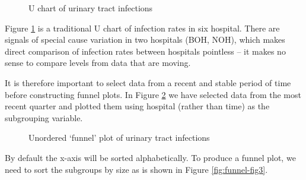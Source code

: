 \documentclass[
]{book}
\makeatletter
\newenvironment{Shaded}{\begin{snugshade}}{\end{snugshade}}
\newcommand{\AttributeTok}[1]{\textcolor[rgb]{0.13,0.29,0.53}{#1}}
\newcommand{\CommentTok}[1]{\textcolor[rgb]{0.56,0.35,0.01}{\textit{#1}}}
\newcommand{\DecValTok}[1]{\textcolor[rgb]{0.00,0.00,0.81}{#1}}
\newcommand{\FunctionTok}[1]{\textcolor[rgb]{0.13,0.29,0.53}{\textbf{#1}}}
\newcommand{\NormalTok}[1]{#1}
\newcommand{\OtherTok}[1]{\textcolor[rgb]{0.56,0.35,0.01}{#1}}
\newcommand{\SpecialCharTok}[1]{\textcolor[rgb]{0.81,0.36,0.00}{\textbf{#1}}}
\newcommand{\StringTok}[1]{\textcolor[rgb]{0.31,0.60,0.02}{#1}}
\newcommand*\pandocbounded[1]{%
  \sbox\pandoc@box{#1}%
  \Gscale@div\@tempa{\textheight}{\dimexpr\ht\pandoc@box+\dp\pandoc@box\relax}%
  \Gscale@div\@tempb{\linewidth}{\wd\pandoc@box}%
  \ifdim\@tempb\p@<\@tempa\p@\let\@tempa\@tempb\fi%
  \ifdim\@tempa\p@<\p@\scalebox{\@tempa}{\usebox\pandoc@box}%
  \else\usebox{\pandoc@box}%
  \fi%
}
\makeatother
\begin{document}
\begin{figure}
\centering
\pandocbounded{}
\caption{\label{fig:funnel-fig1}U chart of urinary tract infections}
\end{figure}

Figure \ref{fig:funnel-fig1} is a traditional U chart of infection rates in six hospital. There are signals of special cause variation in two hospitals (BOH, NOH), which makes direct comparison of infection rates between hospitals pointless -- it makes no sense to compare levels from data that are moving.

It is therefore important to select data from a recent and stable period of time before constructing funnel plots. In Figure \ref{fig:funnel-fig2} we have selected data from the most recent quarter and plotted them using hospital (rather than time) as the subgrouping variable.

\begin{Shaded}
\end{Shaded}

\begin{figure}
\centering
\pandocbounded{}
\caption{\label{fig:funnel-fig2}Unordered `funnel' plot of urinary tract infections}
\end{figure}

By default the x-axis will be sorted alphabetically. To produce a funnel plot, we need to sort the subgroups by size as is shown in Figure \ref{fig:funnel-fig3}.
\end{document}
